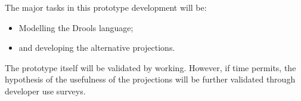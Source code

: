 The major tasks in this prototype development will be: 
\begin{itemize}
    \item Modelling the Drools language;
    \item and developing the alternative projections.
\end{itemize}

The prototype itself will be validated by working.
However, if time permits, the hypothesis of the usefulness of the projections will be further validated through developer use surveys.

